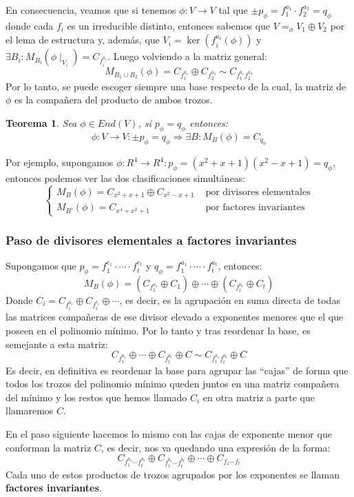 \documentclass[10pt,a4paper,openright]{book}
\theoremstyle{break}
\newtheorem*{theo}{Teorema}
\begin{document}
En consecuencia, veamos que si tenemos $\phi: V\rightarrow V$ tal que $\pm p_\phi = f_1^{a_1}\cdot f_2^{a_2} = q_\phi$ donde cada $f_i$ es un irreducible distinto, entonces sabemos que $V=_\phi V_1\oplus V_2$ por el lema de estructura y, además, que $V_i=\ker (f_i^{a_i}(\phi))$ y $\exists B_i: M_{B_i}(\phi\mid_{V_i})=C_{f_i^{a_i}}$. Luego volviendo a la matriz general:
$$M_{B_1\cup B_2}(\phi)=C_{f_1^{a_1}}\oplus C_{f_2^{a_2}}\sim C_{f_1^{a_1}f_2^{a_2}}$$
Por lo tanto, se puede escoger siempre una base respecto de la cual, la matriz de $\phi$ es la compañera del producto de ambos trozos.
\begin{theo}
Sea $\phi \in End(V)$, si $p_\phi = q_\phi$ entonces:
$$\phi: V\rightarrow V:\pm p_\phi = q_\phi \Rightarrow \exists B: M_{B}(\phi)=C_{q_{\phi}}$$
\end{theo}
Por ejemplo, supongamos $\phi: R^{4}\rightarrow R^{4}: p_\phi=(x^2+x+1)(x^2-x+1)=q_\phi$, entonces podemos ver las dos clasificaciones simultáneas:
$$\begin{cases} M_{B}(\phi)=C_{x^2+x+1}\oplus C_{x^2-x+1} & \mbox{ por divisores elementales}\\ M_{B'}(\phi)= C_{x^4+x^2+1}& \mbox{ por factores invariantes}\end{cases}$$

\subsubsection*{Paso de divisores elementales a factores invariantes}
Supongamos que $p_\phi = f_1^{e_1}\cdot \cdots \cdot f_t^{e_t}$ y $q_\phi= f_1^{a_1}\cdot \cdots \cdot f_t^{a_t}$, entonces:
$$M_B(\phi)=\left(C_{f_1^{a_1}} \oplus C_{1}\right)\oplus \cdots \oplus \left(C_{f_t^{a_t}} \oplus C_{t}\right)$$
Donde $C_i=C_{f_i^{b_1}}\oplus C_{f_i^{c_i}} \oplus \cdots$, es decir, es la agrupación en suma directa de todas las matrices compañeras de ese divisor elevado a exponentes menores que el que poseen en el polinomio mínimo. Por lo tanto y tras reordenar la base, es semejante a esta matriz:
$$C_{f_1^{a_1}}\oplus \cdots\oplus C_{f_t^{a_t}}\oplus C\sim C_{f_1^{a_1}f_t^{a_t}}\oplus C$$
Es decir, en definitiva es reordenar la base para agrupar las ``cajas'' de forma que todos los trozos del polinomio mínimo queden juntos en una matriz compañera del mínimo y los restos que hemos llamado $C_i$ en otra matriz a parte que llamaremos $C$.

En el paso siguiente hacemos lo mismo con las cajas de exponente menor que conforman la matriz $C$, es decir, nos va quedando una expresión de la forma:
$$C_{f_1^{a_1}\cdots f_t^{a_t}}\oplus C_{f_1^{b_1}\cdots f_t^{b_t}} \oplus \cdots \oplus C_{f_1\cdots f_t}$$
Cada uno de estos productos de trozos agrupados por los exponentes se llaman \textbf{factores invariantes}.
\end{document}
